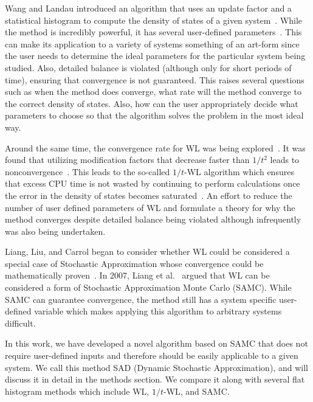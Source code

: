 \documentclass[letterpaper,twocolumn,amsmath,amssymb,pre,aps,10pt]{revtex4-1}
\begin{document}
Wang and Landau introduced an algorithm that uses an update factor and
a statistical histogram to compute the density of states of a given
system~\cite{wang2001determining, wang2001efficient}.  While the method
is incredibly powerful, it has several user-defined
parameters~\cite{landau2004new}.  This can make its application to a
variety of systems something of an art-form since the user needs to
determine the ideal parameters for the particular system being studied.
Also, detailed balance is violated (although only for short periods of
time), ensuring that convergence is not guaranteed.  This raises
several questions such as when the method does converge, what rate will
the method converge to the correct density of states. Also, how can the
user appropriately decide what parameters to choose so that the
algorithm solves the problem in the most ideal way.

Around the same time, the convergence rate for WL was being
explored~\cite{zhou2005understanding,lee2006convergence,
belardinelli2007wang}. It was found that utilizing modification factors
that decrease faster than $1/t^2$ leads to
nonconvergence~\cite{belardinelli2007fast}.  This leads to the so-called
$1/t$-WL algorithm which ensures that excess CPU time is not wasted by
continuing to perform calculations once the error in the density of
states becomes saturated~\cite{belardinelli2008analysis}. An effort to
reduce the number of user defined parameters of WL and formulate a
theory for why the method converges despite detailed balance being
violated although infrequently was also being undertaken.

Liang, Liu, and Carrol began to consider whether WL could be considered
a special case of Stochastic Approximation whose convergence could be
mathematically proven~\cite{liang2006theory, liang2007stochastic}. In
2007, Liang et al.~\cite{liang2007stochastic} argued that WL can be
considered a form of Stochastic Approximation Monte Carlo (SAMC). While
SAMC can guarantee convergence, the method still has a system specific
user-defined variable which makes applying this algorithm to arbitrary
systems difficult.

In this work, we have developed a novel algorithm based on SAMC that
does not require user-defined inputs and therefore should be easily
applicable to a given system.  We call this method SAD (Dynamic
Stochastic Approximation), and will discuss it in detail in the methods
section. We compare it along with several flat histogram methods
which include WL, $1/t$-WL, and SAMC.
\end{document}
